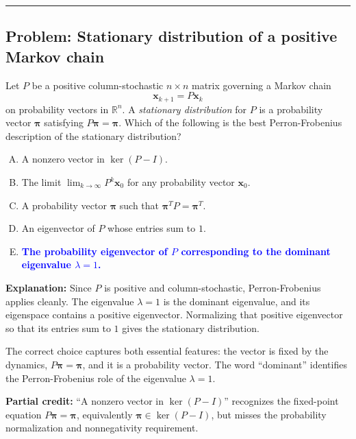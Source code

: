 \documentclass[12pt]{amsart}
\newcommand{\divider}{
  \vspace{-1em}
  \noindent
  \raisebox{-0.15ex}{\textbullet}%
  \hspace{0.5em}%
  \rule[0.5ex]{0.95\textwidth}{1.0pt}%
  \hspace{0.5em}%
  \raisebox{-0.15ex}{\textbullet}%
  \vspace{0em}
}
\begin{document}
\divider

\subsection*{Problem: Stationary distribution of a positive Markov chain}

Let $P$ be a positive column-stochastic $n \times n$ matrix governing a
Markov chain
\[
\mathbf{x}_{k+1} = P \mathbf{x}_k
\]
on probability vectors in $\mathbb{R}^n$. A \emph{stationary distribution}
for $P$ is a probability vector $\boldsymbol{\pi}$ satisfying
$P\boldsymbol{\pi} = \boldsymbol{\pi}$. Which of the following is the best
Perron-Frobenius description of the stationary distribution?

\begin{enumerate}[(A)]
\item A nonzero vector in $\ker(P-I)$.
\item The limit $\lim_{k\to\infty} P^k\mathbf{x}_0$ for any probability vector $\mathbf{x}_0$.
\item A probability vector $\boldsymbol{\pi}$ such that $\boldsymbol{\pi}^T P = \boldsymbol{\pi}^T$.
\item An eigenvector of $P$ whose entries sum to $1$.
\item \textcolor{blue}{\textbf{The probability eigenvector of $P$ corresponding to the dominant eigenvalue $\lambda = 1$.}}
\end{enumerate}

\textbf{Explanation:}
Since $P$ is positive and column-stochastic, Perron-Frobenius applies cleanly.
The eigenvalue $\lambda = 1$ is the dominant eigenvalue, and its eigenspace
contains a positive eigenvector. Normalizing that positive eigenvector so
that its entries sum to $1$ gives the stationary distribution.

The correct choice captures both essential features: the vector is fixed by
the dynamics, $P\boldsymbol{\pi} = \boldsymbol{\pi}$, and it is a probability
vector. The word ``dominant'' identifies the Perron-Frobenius role of the
eigenvalue $\lambda = 1$.

\textbf{Partial credit:}
``A nonzero vector in $\ker(P-I)$'' recognizes the fixed-point equation
$P\boldsymbol{\pi} = \boldsymbol{\pi}$, equivalently
$\boldsymbol{\pi} \in \ker(P-I)$, but misses the probability normalization
and nonnegativity requirement.
\end{document}
